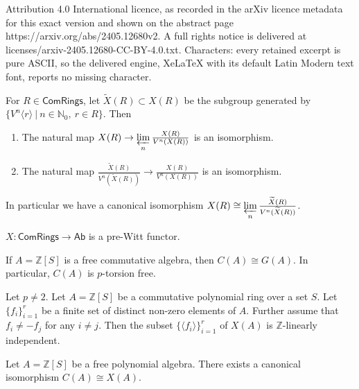 \documentclass[10pt,a4paper]{amsart}
\newcommand{\Com}{{\mathsf{ComRings}}}
\newcommand{\N}{{\mathbb N}}
\newcommand{\Z}{{\mathbb Z}}
\newcommand{\ab}[1]{\langle {#1} \rangle}
\newcommand{\ac}[1]{\{#1\}}
\newcommand{\ilim}{\mathop{\varprojlim}\limits} %
\renewcommand{\tilde}{\widetilde}
\begin{document}
Attribution 4.0 International licence, as recorded in the arXiv licence metadata for this exact version and shown on the abstract page https://arxiv.org/abs/2405.12680v2. A full rights notice is delivered at licenses/arxiv-2405.12680-CC-BY-4.0.txt. Characters: every retained excerpt is pure ASCII, so the delivered engine, XeLaTeX with its default Latin Modern text font, reports no missing character.
\begin{lemma}\label{ilimxa} 
For $R \in \Com$, let $\tilde{X}(R)\subset X(R)$ be the subgroup generated by \\
$\ac{V^n\ab{r} \ | \ n\in \N_0, \ r\in R}$. Then 
\begin{enumerate}
\item The natural map $X(R) \to \ilim_n \frac{X(R)}{V^n(X(R))}$ is an isomorphism. 
\item The natural map $\frac{\tilde{X}(R)}{V^n(\tilde{X}(R))} \to \frac{X(R)}{V^n(X(R))}$ is an isomorphism.
\end{enumerate}
In particular we have a canonical isomorphism 
$X(R) \cong \ilim_n\frac{\tilde{X}(R)}{V^n(\tilde{X}(R))}$.
\end{lemma}

\begin{lemma}\label{xisprewitt} $X : \Com \to \mathsf{Ab}$ is a pre-Witt functor.
\end{lemma}

\begin{lemma}\label{ceqg}
If $A=\Z[S]$ is a free commutative algebra, then $C(A) \cong G(A)$. In particular, $C(A)$ is $p$-torsion free.
\end{lemma}

\begin{lemma}\label{zindcomm} Let $p\neq 2$.
Let $A = \Z[S]$ be a commutative polynomial ring over a set $S$. Let $\{f_i\}_{i=1}^r$ be a finite set of distinct non-zero elements of $A$. Further assume that $f_i\neq -f_j$ for any $i\neq j$. Then the subset $\{\ab{f_i}\}_{i=1}^r$ of $X(A)$ is $\Z$-linearly independent. 
\end{lemma}

\begin{lemma} \label{genrelxa} Let $A=\Z[S]$ be a free polynomial algebra. 
There exists a canonical isomorphism  $C(A) \cong X(A)$. 
\end{lemma}
\end{document}
